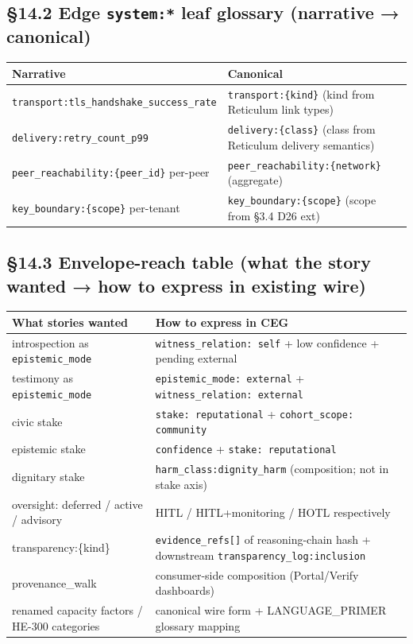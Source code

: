 \documentclass[10pt]{article}
\begin{document}
\subsection*{§14.2 Edge \texttt{system:*} leaf glossary (narrative → canonical)}


{\footnotesize
\begin{longtable}{|p{8.0cm}|p{8.0cm}|}\hline
\textbf{Narrative} & \textbf{Canonical} \\ \hline\endhead
\texttt{transport:tls\_handshake\_success\_rate} & \texttt{transport:\{kind\}} (kind from Reticulum link types) \\ \hline
\texttt{delivery:retry\_count\_p99} & \texttt{delivery:\{class\}} (class from Reticulum delivery semantics) \\ \hline
\texttt{peer\_reachability:\{peer\_id\}} per-peer & \texttt{peer\_reachability:\{network\}} (aggregate) \\ \hline
\texttt{key\_boundary:\{scope\}} per-tenant & \texttt{key\_boundary:\{scope\}} (scope from §3.4 D26 ext) \\ \hline
\end{longtable}}


\subsection*{§14.3 Envelope-reach table (what the story wanted → how to express in existing wire)}


{\footnotesize
\begin{longtable}{|p{8.0cm}|p{8.0cm}|}\hline
\textbf{What stories wanted} & \textbf{How to express in CEG} \\ \hline\endhead
introspection as \texttt{epistemic\_mode} & \texttt{witness\_relation: self} + low confidence + pending external \\ \hline
testimony as \texttt{epistemic\_mode} & \texttt{epistemic\_mode: external} + \texttt{witness\_relation: external} \\ \hline
civic stake & \texttt{stake: reputational} + \texttt{cohort\_scope: community} \\ \hline
epistemic stake & \texttt{confidence} + \texttt{stake: reputational} \\ \hline
dignitary stake & \texttt{harm\_class:dignity\_harm} (composition; not in stake axis) \\ \hline
oversight: deferred / active / advisory & HITL / HITL+monitoring / HOTL respectively \\ \hline
transparency:\{kind\} & \texttt{evidence\_refs[]} of reasoning-chain hash + downstream \texttt{transparency\_log:inclusion} \\ \hline
provenance\_walk & consumer-side composition (Portal/Verify dashboards) \\ \hline
renamed capacity factors / HE-300 categories & canonical wire form + LANGUAGE\_PRIMER glossary mapping \\ \hline
\end{longtable}}
\end{document}
